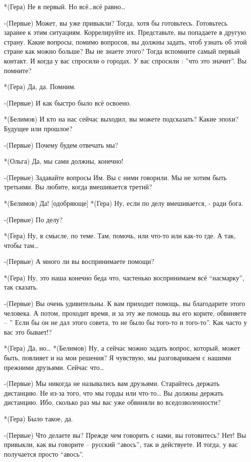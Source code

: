 *(Гера) Не в первый.  Но всё…всё равно…

-(Первые) Может, вы уже привыкли? Тогда, хотя бы готовьтесь. Готовьтесь заранее к этим ситуациям. Коррелируйте их. Представьте, вы попадаете в другую страну. Какие вопросы, помимо вопросов, вы должны задать, чтоб узнать об этой стране как можно больше? Вы не знаете этого? Тогда вспомните самый первый контакт. И когда у вас спросили о городах. У вас спросили : ”что это значит”. Вы помните?

*(Гера) Да, да. Помним.

-(Первые) И как быстро было всё освоено.

*(Белимов) И кто на нас сейчас выходил, вы можете подсказать? Какие эпохи? Будущее или прошлое?

-(Первые) Почему будем отвечать мы?

*(Ольга)  Да, мы сами должны, конечно!

-(Первые) Задавайте вопросы Им. Вы с ними говорили. Мы не хотим быть третьими. Вы любите, когда вмешивается третий?

*(Белимов) Да! [одобряюще]
*(Гера) Ну, если по делу вмешивается, - ради бога.

-(Первые) По делу?

*(Гера) Ну, в смысле, по теме. Там, помочь, или что-то или как-то где. А так, чтобы там…

-(Первые) А много ли вы воспринимаете помощи?

*(Гера) Ну, это наша конечно беда что, частенько воспринимаем всё “насмарку”, так сказать.

-(Первые) Вы очень удивительны. К вам приходит помощь, вы благодарите этого человека. А потом, проходит время, и за эту же помощь вы его корите, обвиняете – ” Если бы он не дал этого совета, то не было бы того-то и того-то”. Как часто у вас это бывает!?

*(Гера) Да, но…
*(Белимов) Ну, а сейчас можно задать вопрос, который, может быть, повлияет и на мои решения?  Я чувствую, мы разговариваем с нашими прежними друзьями. Сейчас что…

-(Первые) Мы никогда не назывались вам друзьями. Старайтесь держать дистанцию. Не из-за того, что мы горды или что-то… Вы должны держать дистанцию. Ибо, сколько раз мы вас уже обвиняли во вседозволенности?

*(Гера) Было такое, да.

-(Первые) Что делаете вы? Прежде чем говорить с нами, вы готовитесь? Нет! Вы привыкли, как вы говорите  – русский “авось”, так и действуете. И тогда, у вас получается просто “авось”.

